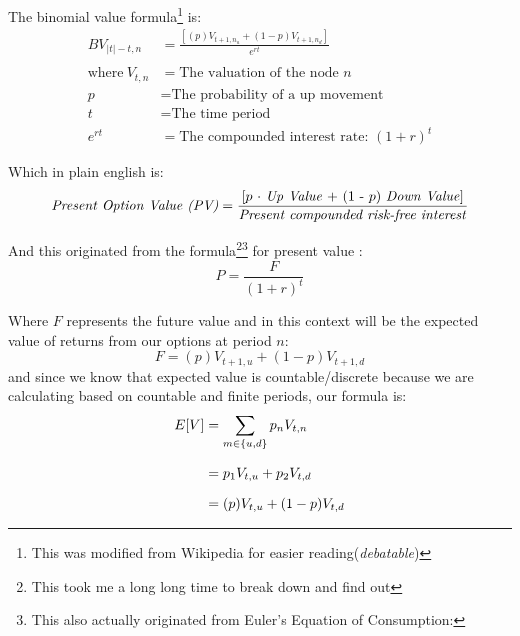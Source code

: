 \documentclass[12pt, letterpaper]{article}\usepackage{float}
\begin{document}
\bigskip

The binomial value formula\footnote{This was modified from Wikipedia for easier reading(\textit{debatable})} is:
\begin{align*}
  BV_{\vert t \vert - t, n} &= \frac{[(p)V_{t+1,n_u} + (1-p)V_{t+1,n_d}]}{e^{rt}} \\
  \\
  \text{where}~V_{t,n} &= \text{The valuation of the node ${n}$} \\
  p &= \text{The probability of a up movement} \\
  t &= \text{The time period} \\
  e^{rt} &= \text{The compounded interest rate: } (1 + r)^t
\end{align*}

\pagebreak

Which in plain english is:
\begin{equation*}
  \text{\textit{Present Option Value (PV)}} = \frac{\text{[${p}$ ${\cdot}$ \textit{Up Value} + (1 - ${p}$) \textit{Down Value}]}}{\textrm{\textit{Present compounded risk-free interest}}}
\end{equation*}

\bigskip

And this originated from the formula\footnote{This took me a long long time to break down and find out}\footnote{This also actually originated from Euler's Equation of Consumption: } for present value \cite{presentvaluewikipedia}:
\begin{equation*}
  P = \frac{F}{(1+r)^t}
\end{equation*}

\noindent Where ${F}$ represents the future value and in this context will be the expected value of returns from our options at period ${n}$:
\begin{equation*}
  F = (p)V_{t+1,u} + (1-p)V_{t+1,d}
\end{equation*}
and since we know that expected value is countable/discrete because we are calculating based on countable and finite periods, our formula is:
\begin{equation*}
  \setlength{\jot}{10pt}
  \begin{split}
    E[V] 
    & = \sum\limits_{m \in \{u,d\}} p_n V_{t,n} \\
    & = p_1 V_{t,u} + p_2 V_{t,d} \\
    & = (p) V_{t,u} + (1-p) V_{t,d} \\
  \end{split}
\end{equation*}
\end{document}
